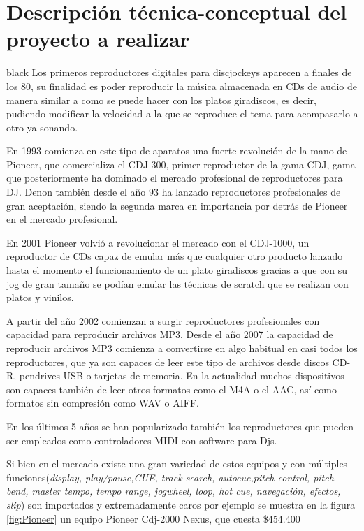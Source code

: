 \documentclass[11pt]{charter}
\begin{document}
\section{Descripción técnica-conceptual del proyecto a realizar}
\label{sec:descripcion}

\begin{consigna}{black}
Los primeros reproductores digitales para discjockeys aparecen a finales de los 80, su finalidad es poder reproducir la música almacenada en CDs de audio de manera similar a como se puede hacer con los platos giradiscos, es decir, pudiendo modificar la velocidad a la que se reproduce el tema para acompasarlo a otro ya sonando.

En 1993 comienza en este tipo de aparatos una fuerte revolución de la mano de Pioneer, que comercializa el CDJ-300, primer reproductor de la gama CDJ, gama que posteriormente ha dominado el mercado profesional de reproductores para DJ. Denon también desde el año 93 ha lanzado reproductores profesionales de gran aceptación, siendo la segunda marca en importancia por detrás de Pioneer en el mercado profesional.

En 2001 Pioneer volvió a revolucionar el mercado con el CDJ-1000, un reproductor de CDs capaz de emular más que cualquier otro producto lanzado hasta el momento el funcionamiento de un plato giradiscos gracias a que con su jog de gran tamaño se podían emular las técnicas de scratch que se realizan con platos y vinilos. 

A partir del año 2002 comienzan a surgir reproductores profesionales con capacidad para reproducir archivos MP3. Desde el año 2007 la capacidad de reproducir archivos MP3 comienza a convertirse en algo habitual en casi todos los reproductores, que ya son capaces de leer este tipo de archivos desde discos CD-R, pendrives USB o tarjetas de memoria. En la actualidad muchos dispositivos son capaces también de leer otros formatos como el M4A o el AAC, así como formatos sin compresión como WAV o AIFF.

En los últimos 5 años se han popularizado también los reproductores que pueden ser empleados como controladores MIDI con software para Djs.

Si bien en el mercado existe una gran variedad de estos equipos y con múltiples funciones(\textit{display, play/pause,CUE, track search, autocue,pitch control, pitch bend, master tempo, tempo range, jogwheel, loop, hot cue, navegación, efectos, slip}) son importados y extremadamente caros por ejemplo se muestra en la figura \ref{fig:Pioneer} un equipo Pioneer Cdj-2000 Nexus, que cuesta \$454.400


\end{consigna}
\end{document}
